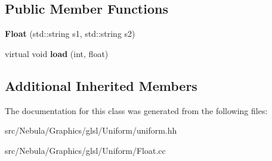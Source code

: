 \subsection*{Public Member Functions}
\begin{DoxyCompactItemize}
\item 
\hypertarget{classNeb_1_1glsl_1_1Uniform_1_1Vector_1_1Float_a79fa9f7bd948d86a054e5ab2bd0f4e40}{{\bfseries Float} (std\-::string s1, std\-::string s2)}\label{classNeb_1_1glsl_1_1Uniform_1_1Vector_1_1Float_a79fa9f7bd948d86a054e5ab2bd0f4e40}

\item 
\hypertarget{classNeb_1_1glsl_1_1Uniform_1_1Vector_1_1Float_a9a71da7e73a83c7e3f8d243a994bf4b8}{virtual void {\bfseries load} (int, float)}\label{classNeb_1_1glsl_1_1Uniform_1_1Vector_1_1Float_a9a71da7e73a83c7e3f8d243a994bf4b8}

\end{DoxyCompactItemize}
\subsection*{Additional Inherited Members}


The documentation for this class was generated from the following files\-:\begin{DoxyCompactItemize}
\item 
src/\-Nebula/\-Graphics/glsl/\-Uniform/uniform.\-hh\item 
src/\-Nebula/\-Graphics/glsl/\-Uniform/Float.\-cc\end{DoxyCompactItemize}
